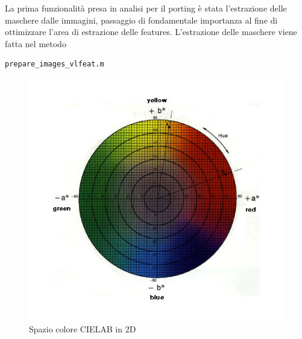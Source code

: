 \documentclass[a4paper,12pt]{report}
\begin{document}
      La prima funzionalità presa in analisi per il porting è stata l'estrazione delle maschere dalle immagini,
      passaggio di fondamentale importanza al fine di ottimizzare l'area di estrazione delle features. L'estrazione delle maschere viene fatta
      nel metodo 
      \begin{verbatim}
prepare_images_vlfeat.m
      \end{verbatim}
      \begin{figure}[H]
        \centering
        
        \begin{minipage}{0.35\textwidth}
          \centering
          \includegraphics[width=\textwidth]{assets/images/methods/porting/cielab/cielab2.jpg}  
          \caption{Spazio colore CIELAB in 2D}
        \end{minipage}
        \begin{minipage}{0.35\textwidth}
          \centering

\end{minipage}
\end{figure}
\end{document}
